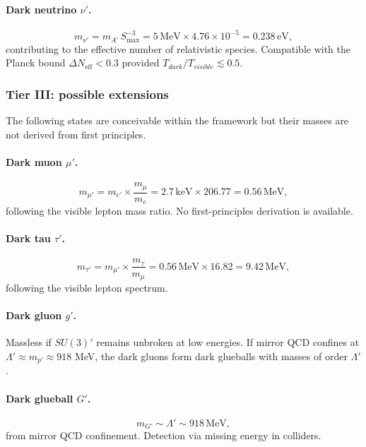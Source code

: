\documentclass[12pt,oneside,openany]{book}
\begin{document}
\paragraph{Dark neutrino \texorpdfstring{$\nu'$}{nu'}.}
\begin{equation}
m_{\nu'}
=
m_{A'}\,S_{\max}^{-3}
=
5\,\text{MeV}\times 4.76\times 10^{-5}
=
0.238\,\text{eV},
\label{eq:mnu'-tier2}
\end{equation}
contributing to the effective number of relativistic species.
Compatible with the Planck bound $\Delta N_{\text{eff}}<0.3$
provided $T_{dark}/T_{visible}\lesssim 0.5$.

\subsubsection{Tier III: possible extensions}

The following states are conceivable within the framework but
their masses are not derived from first principles.

\paragraph{Dark muon \texorpdfstring{$\mu'$}{mu'}.}
\begin{equation}
m_{\mu'}
=
m_{e'}\times\frac{m_{\mu}}{m_{e}}
=
2.7\,\text{keV}\times 206.77
=
0.56\,\text{MeV},
\label{eq:mmu'-tier3}
\end{equation}
following the visible lepton mass ratio. No first-principles
derivation is available.

\paragraph{Dark tau \texorpdfstring{$\tau'$}{tau'}.}
\begin{equation}
m_{\tau'}
=
m_{\mu'}\times\frac{m_{\tau}}{m_{\mu}}
=
0.56\,\text{MeV}\times 16.82
=
9.42\,\text{MeV},
\label{eq:mtau'-tier3}
\end{equation}
following the visible lepton spectrum.

\paragraph{Dark gluon \texorpdfstring{$g'$}{g'}.}
Massless if $SU(3)'$ remains unbroken at low energies. If mirror
QCD confines at $\Lambda'\approx m_{p'}\approx 918$ MeV, the dark
gluons form dark glueballs with masses of order $\Lambda'$.

\paragraph{Dark glueball \texorpdfstring{$G'$}{G'}.}
\begin{equation}
m_{G'}
\sim
\Lambda'
\sim
918\,\text{MeV},
\label{eq:mG'-tier3}
\end{equation}
from mirror QCD confinement. Detection via missing energy in
colliders.
\end{document}
